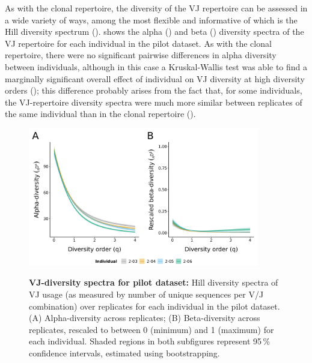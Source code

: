As with the clonal repertoire, the diversity of the VJ repertoire can be assessed in a wide variety of ways, among the most flexible and informative of which is the Hill diversity spectrum ().  shows the alpha () and beta () diversity spectra of the VJ repertoire for each individual in the pilot dataset. As with the clonal repertoire, there were no significant pairwise differences in alpha diversity between individuals, although in this case a Kruskal-Wallis test was able to find a marginally significant overall effect of individual on VJ diversity at high diversity orders (); this difference probably arises from the fact that, for some individuals, the VJ-repertoire diversity spectra were much more similar between replicates of the same individual than in the clonal repertoire (). 

\begin{figure}
\centering
\includegraphics[width = 0.9\textwidth]{_Figures/png/pilot-vj-diversity}
\begin{subfigure}{0em}
\label{fig:igseq-pilot-vj-diversity-alpha}
\end{subfigure}
\begin{subfigure}{0em}
\label{fig:igseq-pilot-vj-diversity-beta}
\end{subfigure}
\caption{\textbf{VJ-diversity spectra for pilot dataset:} Hill diversity spectra of VJ usage (as measured by number of unique sequences per V/J combination) over replicates for each individual in the pilot dataset. (A) Alpha-diversity across replicates; (B) Beta-diversity across replicates, rescaled to between 0 (minimum) and 1 (maximum) for each individual. Shaded regions in both subfigures represent 95\,\% confidence intervals, estimated using bootstrapping.} %
\label{fig:igseq-pilot-vj-diversity}
\end{figure}

